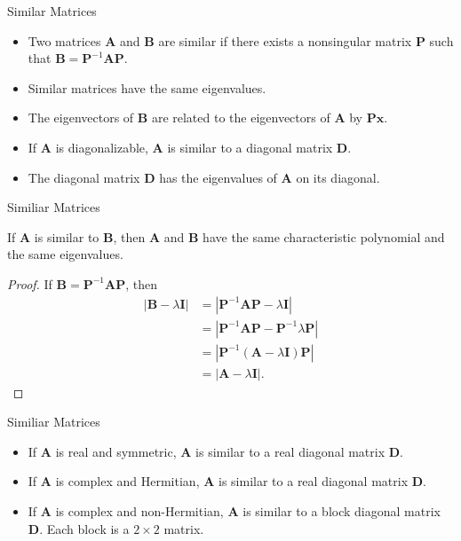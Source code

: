 \documentclass{beamer}
\begin{document}
\begin{frame}{Similar Matrices}
    \begin{itemize}
        \item Two matrices $\mathbf{A}$ and $\mathbf{B}$ are similar if there exists a nonsingular matrix $\mathbf{P}$ such that $\mathbf{B}=\mathbf{P}^{-1} \mathbf{A} \mathbf{P}$.
        \item Similar matrices have the same eigenvalues.
        \item The eigenvectors of $\mathbf{B}$ are related to the eigenvectors of $\mathbf{A}$ by $\mathbf{P} \mathbf{x}$.
        \item If $\mathbf{A}$ is diagonalizable,  $\mathbf{A}$ is similar to a diagonal matrix $\mathbf{D}$.
        \item The diagonal matrix $\mathbf{D}$ has the eigenvalues of $\mathbf{A}$ on its diagonal.
    \end{itemize}
\end{frame}
\begin{frame}{Similiar Matrices}

\begin{theorem}
    If $\mathbf{A}$ is similar to $\mathbf{B}$, then $\mathbf{A}$ and $\mathbf{B}$ have the same characteristic polynomial and the same eigenvalues.
\end{theorem}
\begin{proof}
    If $\mathbf{B}=\mathbf{P}^{-1} \mathbf{A} \mathbf{P}$, then
    \begin{align*}
        |\mathbf{B}-\lambda \mathbf{I}|&=|\mathbf{P}^{-1} \mathbf{A} \mathbf{P}-\lambda \mathbf{I}|\\
        &=|\mathbf{P}^{-1} \mathbf{A} \mathbf{P}-\mathbf{P}^{-1}\lambda \mathbf{P}|\\
        &=|\mathbf{P}^{-1} (\mathbf{A}-\lambda \mathbf{I}) \mathbf{P}|\\
        &=|\mathbf{A}-\lambda \mathbf{I}|.
    \end{align*}
\end{proof}
\end{frame}

\begin{frame}{Similiar Matrices}
    \begin{itemize}
        \item If $\mathbf{A}$ is real and symmetric,  $\mathbf{A}$ is similar to a real diagonal matrix $\mathbf{D}$.
        \item If $\mathbf{A}$ is complex and Hermitian,  $\mathbf{A}$ is similar to a real diagonal matrix $\mathbf{D}$.
        \item If $\mathbf{A}$ is complex and non-Hermitian,  $\mathbf{A}$ is similar to a block diagonal matrix $\mathbf{D}$. Each block is a $2\times 2$ matrix.   
    \end{itemize}
\end{frame}
\end{document}
